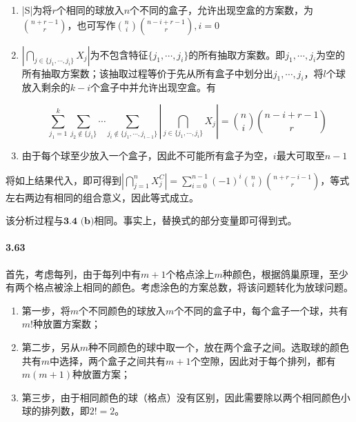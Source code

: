 \documentclass{../notes}
\begin{document}
    \begin{enumerate}
        \item |S|为将$r$个相同的球放入$n$个不同的盒子，允许出现空盒的方案数，为$\binom{n + r - 1}{r}$，也可写作$\binom{n}{i}\binom{n - i + r - 1}{r}, i = 0$
        \item $\left|\bigcap_{j\in\{j_1, \cdots, j_i\}}X_j\right|$为不包含特征$\{j_1, \cdots, j_i\}$的所有抽取方案数。即$j_1, \cdots, j_i$为空的所有抽取方案数；该抽取过程等价于先从所有盒子中划分出$j_1, \cdots, j_i$，将$l$个球放入剩余的$k-i$个盒子中并允许出现空盒。有

        \begin{equation*}
            \sum_{j_{1}=1}^k\sum_{j_{2}\not\in \{j_1\}}\cdots\sum_{j_{i}\not\in \{j_1, \cdots, j_{i-1}\}}\left|\bigcap_{j\in\{j_1, \cdots, j_i\}} X_j\right| = \binom{n}{i}\binom{n-i+r-1}{r}
        \end{equation*}

        \item 由于每个球至少放入一个盒子，因此不可能所有盒子为空，$i$最大可取至$n-1$
    \end{enumerate}

    将如上结果代入，即可得到$\left|\bigcap_{j=1}^n X_j^C\right| = \sum_{i=0}^{n-1}(-1)^i \binom{n}{i} \binom{n + r - i - 1}{r}$，等式左右两边有相同的组合意义，因此等式成立。

    该分析过程与$\textbf{3.4 (b)}$相同。事实上，替换式的部分变量即可得到式。

    \paragraph*{3.63} 首先，考虑每列，由于每列中有$m + 1$个格点涂上$m$种颜色，根据鸽巢原理，至少有两个格点被涂上相同的颜色。考虑涂色的方案总数，将该问题转化为放球问题。

    \begin{enumerate}
        \item 第一步，将$m$个不同颜色的球放入$m$个不同的盒子中，每个盒子一个球，共有$m!$种放置方案数；
        \item 第二步，另从$m$种不同颜色的球中取一个，放在两个盒子之间。选取球的颜色共有$m$中选择，两个盒子之间共有$m + 1$个空隙，因此对于每个排列，都有$m(m + 1)$种放置方案；
        \item 第三步，由于相同颜色的球（格点）没有区别，因此需要除以两个相同颜色小球的排列数，即$2! = 2$。
    \end{enumerate}
\end{document}
